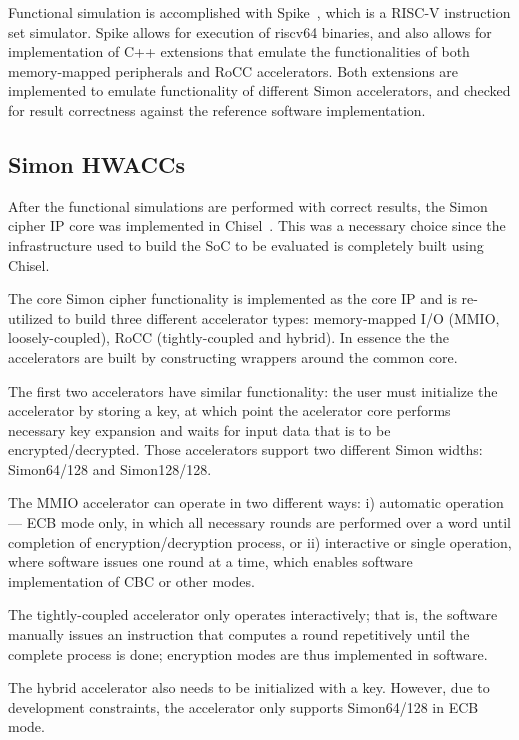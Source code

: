 \documentclass[10pt,conference]{IEEEtran}
\begin{document}
Functional simulation is accomplished with Spike~\cite{spike}, which is a RISC-V
instruction set simulator. Spike allows for execution of riscv64 binaries, and
also allows for implementation of C++ extensions that emulate the
functionalities of both memory-mapped peripherals and RoCC accelerators. Both
extensions are implemented to emulate functionality of different Simon
accelerators, and checked for result correctness against the reference software
implementation.


\subsection{Simon HWACCs}

After the functional simulations are performed with correct results, the Simon
cipher IP core was implemented in Chisel~\cite{chisel}. This was a necessary
choice since the infrastructure used to build the SoC to be evaluated is
completely built using Chisel.

The core Simon cipher functionality is implemented as the core IP and is
re-utilized to build three different accelerator types: memory-mapped I/O
(MMIO, loosely-coupled), RoCC (tightly-coupled and hybrid). In essence the the
accelerators are built by constructing wrappers around the common core.

The first two accelerators have similar functionality: the user must initialize the
accelerator by storing a key, at which point the acelerator core performs
necessary key expansion and waits for input data that is to be
encrypted/decrypted. Those accelerators support two different Simon widths:
Simon64/128 and Simon128/128.

The MMIO accelerator can operate in two different ways: i) automatic
operation --- ECB mode only, in which all necessary rounds are performed over a word until
completion of encryption/decryption process, or ii) interactive or single operation, where
software issues one round at a time, which enables software implementation of
CBC or other modes.

The tightly-coupled accelerator only operates interactively; that is, the
software manually issues an instruction that computes a round repetitively
until the complete process is done; encryption modes are thus
implemented in software.

The hybrid accelerator also needs to be initialized with a key. However, due to
development constraints, the accelerator only supports Simon64/128 in ECB mode.
\end{document}
